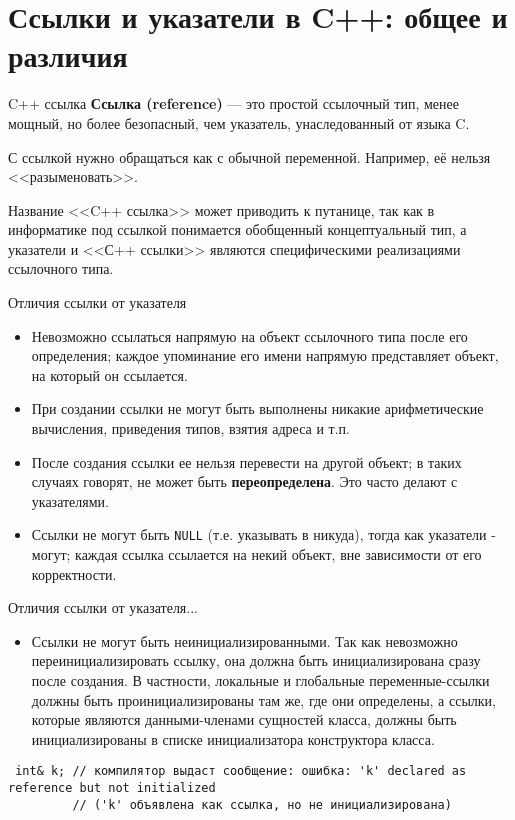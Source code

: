 \section{Ссылки и указатели в C++: общее и различия}

\begin{frame}[t,fragile]{C++ ссылка}
\textbf{Ссылка (reference)} --- это простой ссылочный тип, менее мощный, 
но более безопасный, чем указатель, унаследованный от языка C. 

С ссылкой нужно обращаться как с обычной переменной.
Например, её нельзя <<разыменовать>>.

Название <<C++ ссылка>> может приводить к путанице, 
так как в информатике под ссылкой понимается обобщенный концептуальный тип, 
а указатели и <<С++ ссылки>> являются специфическими реализациями ссылочного типа.
\end{frame}

\begin{frame}[t]{Отличия ссылки от указателя}
\begin{itemize}
\item Невозможно ссылаться напрямую на объект ссылочного типа после его определения; 
каждое упоминание его имени напрямую представляет объект, на который он ссылается.
\item При создании ссылки не могут быть выполнены никакие арифметические вычисления, приведения типов, взятия адреса и т.п.
\item После создания ссылки ее нельзя перевести на другой объект; в таких случаях говорят, не может быть \textbf{переопределена}. 
Это часто делают с указателями.
\item Ссылки не могут быть \texttt{NULL} (т.е. указывать в никуда), 
тогда как указатели - могут; 
каждая ссылка ссылается на некий объект, вне зависимости от его корректности.
\end{itemize}
\end{frame}

\begin{frame}[t,fragile]{Отличия ссылки от указателя...}
\begin{itemize}
\item Ссылки не могут быть неинициализированными. 
Так как невозможно переинициализировать ссылку, она должна быть инициализирована сразу после создания. 
В частности, локальные и глобальные переменные-ссылки должны быть проинициализированы там же, 
где они определены, а ссылки, которые являются данными-членами сущностей класса, 
должны быть инициализированы в списке инициализатора конструктора класса.
\end{itemize}
\begin{lstlisting}
 int& k; // компилятор выдаст сообщение: ошибка: 'k' declared as reference but not initialized 
         // ('k' объявлена как ссылка, но не инициализирована)
\end{lstlisting}
\end{frame}

